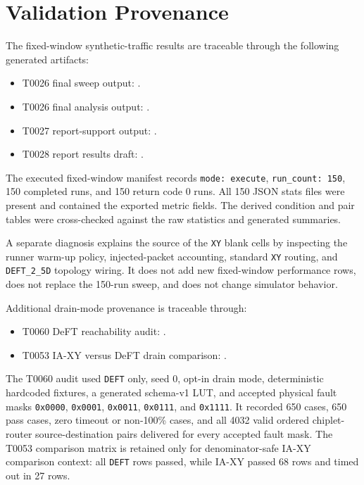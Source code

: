 \documentclass[conference]{IEEEtran}
\begin{document}
\section{Validation Provenance}

The fixed-window synthetic-traffic results are traceable through the following generated artifacts:

\begin{itemize}
    \item T0026 final sweep output: .
    \item T0026 final analysis output: .
    \item T0027 report-support output: .
    \item T0028 report results draft: .
\end{itemize}

The executed fixed-window manifest records \texttt{mode: execute}, \texttt{run\_count: 150}, 150 completed runs, and 150 return code 0 runs. All 150 JSON stats files were present and contained the exported metric fields. The derived condition and pair tables were cross-checked against the raw statistics and generated summaries.

A separate diagnosis explains the source of the \texttt{XY} blank cells by inspecting the runner warm-up policy, injected-packet accounting, standard \texttt{XY} routing, and \texttt{DEFT\_2\_5D} topology wiring. It does not add new fixed-window performance rows, does not replace the 150-run sweep, and does not change simulator behavior.

Additional drain-mode provenance is traceable through:

\begin{itemize}
    \item T0060 DeFT reachability audit: .
    \item T0053 IA-XY versus DeFT drain comparison: .
\end{itemize}

The T0060 audit used \texttt{DEFT} only, seed 0, opt-in drain mode, deterministic hardcoded fixtures, a generated schema-v1 LUT, and accepted physical fault masks \texttt{0x0000}, \texttt{0x0001}, \texttt{0x0011}, \texttt{0x0111}, and \texttt{0x1111}. It recorded 650 cases, 650 pass cases, zero timeout or non-100\% cases, and all 4032 valid ordered chiplet-router source-destination pairs delivered for every accepted fault mask. The T0053 comparison matrix is retained only for denominator-safe IA-XY comparison context: all \texttt{DEFT} rows passed, while IA-XY passed 68 rows and timed out in 27 rows.
\end{document}
